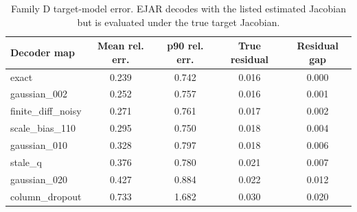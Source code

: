 \begin{table}[t]
\centering
\small
\caption{Family D target-model error. EJAR decodes with the listed estimated Jacobian but is evaluated under the true target Jacobian.}
\label{tab:model-error}
\begin{tabular}{lcccc}
\toprule
Decoder map & Mean rel. err. & p90 rel. err. & True residual & Residual gap \\
\midrule
exact & 0.239 & 0.742 & 0.016 & 0.000 \\
gaussian\_002 & 0.252 & 0.757 & 0.016 & 0.001 \\
finite\_diff\_noisy & 0.271 & 0.761 & 0.017 & 0.002 \\
scale\_bias\_110 & 0.295 & 0.750 & 0.018 & 0.004 \\
gaussian\_010 & 0.328 & 0.797 & 0.018 & 0.006 \\
stale\_q & 0.376 & 0.780 & 0.021 & 0.007 \\
gaussian\_020 & 0.427 & 0.884 & 0.022 & 0.012 \\
column\_dropout & 0.733 & 1.682 & 0.030 & 0.020 \\
\bottomrule
\end{tabular}
\end{table}
